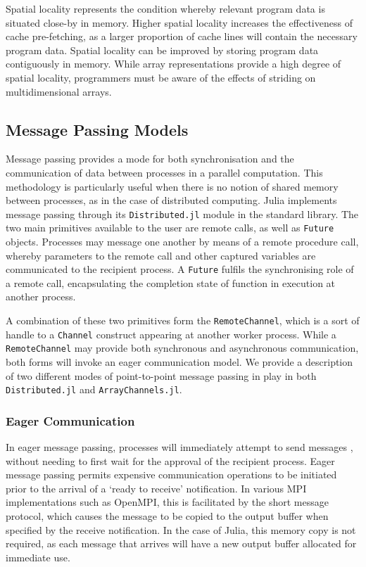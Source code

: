 Spatial locality represents the condition whereby relevant program data is situated close-by in memory. Higher spatial locality increases the effectiveness of cache pre-fetching, as a larger proportion of cache lines will contain the necessary program data. Spatial locality can be improved by storing program data contiguously in memory. While array representations provide a high degree of spatial locality, programmers
must be aware of the effects of striding on multidimensional arrays.

\subsection{Message Passing Models}
\label{sec:message-passing}

Message passing provides a mode for both synchronisation and the
communication of data between processes in a parallel computation. This
methodology is particularly useful when there is no notion of shared
memory between processes, as in the case of distributed computing. Julia
implements message passing through its \texttt{Distributed.jl} module in
the standard library. The two main primitives available to the user are
remote calls, as well as \texttt{Future} objects. Processes may message
one another by means of a remote procedure call, whereby parameters to
the remote call and other captured variables are communicated to the
recipient process. A \texttt{Future} fulfils the synchronising role of
a remote call, encapsulating the completion state of function in
execution at another process.

A combination of these two primitives form the \texttt{RemoteChannel},
which is a sort of handle to a \texttt{Channel} construct appearing at
another worker process. While a \texttt{RemoteChannel} may provide both
synchronous and asynchronous communication, both forms will invoke an
eager communication model. We provide a description of two different
modes of point-to-point message passing in play in both
\texttt{Distributed.jl} and \texttt{ArrayChannels.jl}.

\subsubsection{Eager Communication}
\label{sec:eager}

In eager message passing, processes will immediately attempt to send
messages \cite{illinois, ompi}, without needing to first wait for the
approval of the recipient process. Eager message passing permits expensive
communication operations to be initiated prior to the arrival of a
`ready to receive' notification. In various MPI implementations such as
OpenMPI, this is facilitated by the short message protocol, which causes
the message to be copied to the output buffer when specified by the
receive notification. In the case of Julia, this memory copy is not
required, as each message that arrives will have a new output buffer
allocated for immediate use.

